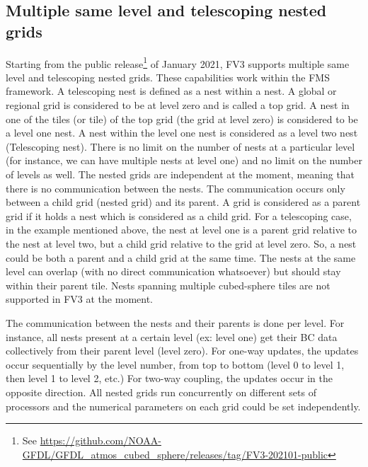 \documentclass[10pt,letterpaper,margin=1in]{memoir}
\begin{document}
\subsection{Multiple same level and telescoping nested grids}
Starting from the public release\footnote{See \href{https://github.com/NOAA-GFDL/GFDL_atmos_cubed_sphere/releases/tag/FV3-202101-public}{https://github.com/NOAA-GFDL/GFDL_atmos_cubed_sphere/releases/tag/FV3-202101-public}} of January 2021, FV3 supports multiple same level and telescoping nested grids. These capabilities work within the FMS framework. A telescoping nest is defined as a nest within a nest. A global or regional grid is considered to be at level zero and is called a top grid. A nest in one of the tiles (or tile) of the top grid (the grid at level zero) is considered to be a level one nest. A nest within the level one nest is considered as a level two nest (Telescoping nest). There is no limit on the number of nests at a particular level (for instance, we can have multiple nests at level one) and no limit on the number of levels as well. The nested grids are independent at the moment, meaning that there is no communication between the nests. The communication occurs only between a child grid (nested grid) and its parent. A grid is considered as a parent grid if it holds a nest which is considered as a child grid. For a telescoping case, in the example mentioned above, the nest at level one is a parent grid relative to the nest at level two, but a child grid relative to the grid at level zero. So, a nest could be both a parent and a child grid at the same time. The nests at the same level can overlap (with no direct communication whatsoever) but should stay within their parent tile. Nests spanning multiple cubed-sphere tiles are not supported in FV3 at the moment. 

The communication between the nests and their parents is done per level. For instance, all nests present at a certain level (ex: level one) get their BC data collectively from their parent level (level zero). For one-way updates, the updates occur sequentially by the level number, from top to bottom (level 0 to level 1, then level 1 to level 2, etc.) For two-way coupling, the updates occur in the opposite direction. All nested grids run concurrently on different sets of processors and the numerical parameters on each grid could be set independently.



\end{document}
